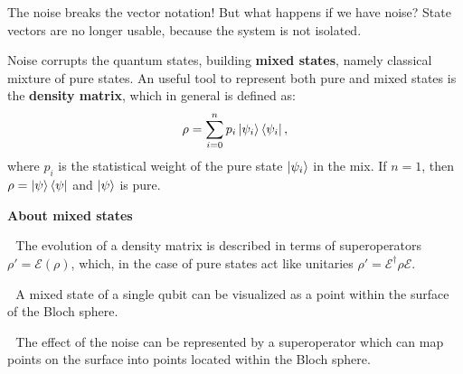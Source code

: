 \documentclass[aspectratio=169, 8pt, xcolor={svgnames}, hyperref={linkcolor=black}]{beamer}
\begin{document}
\begin{frame}{The noise breaks the vector notation!}
\textcolor{carnelian}{But what happens if we have noise?} \pause State vectors 
are no longer usable, because the system is not isolated. \pause

Noise corrupts the quantum states, building \textbf{mixed states}, namely classical 
mixture of pure states. \pause An useful tool to represent both pure and mixed states is the \textbf{density matrix}, 
which in general is defined as:
$$ \rho = \sum_{i=0}^n p_i \ket{\psi_i}\bra{\psi_i}, $$
where $p_i$ is the statistical weight of the pure state $\ket{\psi_i}$ in the mix. 
If $n=1$, then $\rho=\ket{\psi}\bra{\psi}$ and $\ket{\psi}$ is pure. \pause

\begin{multicols}{2}
\textbf{About mixed states}

{\footnotesize\faCircle\,\,} The evolution of a density matrix is described in terms 
of superoperators $\rho' = \mathcal{E} (\rho)$, which, in the case of pure states 
act like unitaries $ \rho' = \mathcal{E}^{\dagger} \rho \mathcal{E}. $ 

{\footnotesize\faCircle\,\,} A mixed state of a single qubit can be visualized as a point within the surface
of the Bloch sphere. 

{\footnotesize\faCircle\,\,} The effect of the noise can be represented by a superoperator
which can map points on the surface into points located within the Bloch sphere.     
\begin{center}
\end{center}
\end{multicols}
\end{frame}
\end{document}
